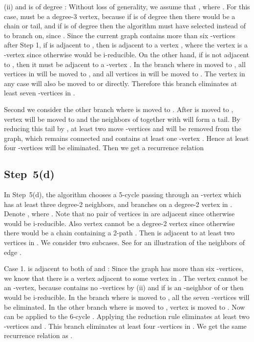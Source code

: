 \documentclass{elsart_TR2}
\begin{document}
(ii)  and  is of degree :
Without loss of generality, we assume that , where  .
For this case,  must be a degree-3 vertex,
because if  is of degree  then there would be a chain or tail,
and if  is of degree  then the algorithm must have selected  instead of  to branch on,
since .
Since  the current graph contains more than six -vertices after Step 1,
  if  is adjacent to , then  is adjacent to  a vertex  ,
where the vertex  is a -vertex since otherwise  would be i-reducible.
On the other hand, if  is not adjacent to ,
 then it must be adjacent to a -vertex .
In the branch where  in moved to ,   all vertices in  will be moved to ,
 and all vertices in   will be moved to .
The vertex  in any case will also be moved to  or  directly.
Therefore this branch eliminates at least seven -vertices in .

Second we consider the other branch where  is moved to .
After  is moved to , vertex  will be moved to  and the neighbors of  together with  will form a tail.
By reducing this tail by , at least two move -vertices  and  will be removed from the graph,
which remains connected and contains at least one -vertex .
Hence at least four -vertices will be eliminated.
Then we get a recurrence relation 




\subsection{Step~5(d)}

In Step~5(d), the algorithm chooses  a 5-cycle  passing through
an  -vertex  which has at least three degree-2  neighbors,
and branches on a degree-2 vertex  in .
Denote , where  .
Note that no pair of vertices in  are adjacent  since otherwise  would be i-reducible.
Also vertex  cannot be a degree-2 vertex since
otherwise there would be a chain containing
a 2-path .
Then  is adjacent to at least two vertices in .
We consider two subcases.
See  for an illustration of the neighbors of edge .

\vspace{-0mm}\vspace{-0mm}

Case 1.  is adjacent to both of  and :
Since the graph has more than six -vertices,
we know that there is a vertex  adjacent to some vertex in
.
The vertex  cannot be an -vertex,
 because   contains no -vertices by (ii)
and if  is an -neighbor of  or  then  would be i-reducible.
In the branch where  is moved to ,
all the seven -vertices  will be eliminated.
In the other branch where  is moved to , vertex  is moved to .
Now  can be applied to the 6-cycle .
Applying the reduction rule  eliminates at least two -vertices  and .
This branch eliminates at least four -vertices in .
We get the same recurrence relation as .
\end{document}
